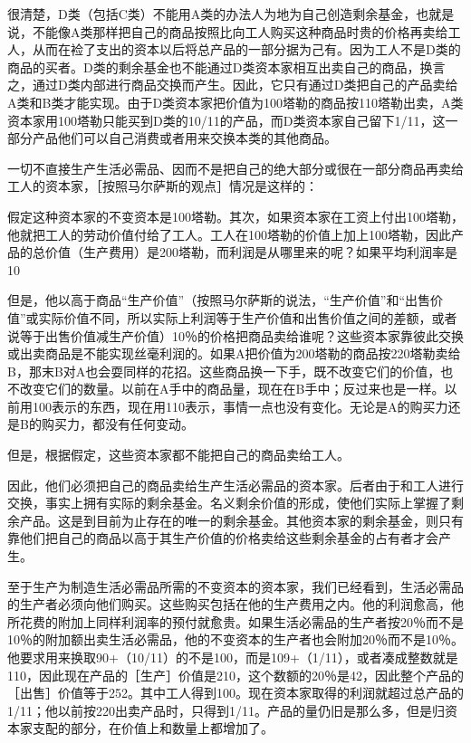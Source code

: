 很清楚，D类（包括C类）不能用A类的办法人为地为自己创造剩余基金，也就是说，不能像A类那样把自己的商品按照比向工人购买这种商品时贵的价格再卖给工人，从而在裣了支出的资本以后将总产品的一部分据为己有。因为工人不是D类的商品的买者。D类的剩余基金也不能通过D类资本家相互出卖自己的商品，换言之，通过D类内部进行商品交换而产生。因此，它只有通过D类把自己的产品卖给A类和B类才能实现。由于D类资本家把价值为100塔勒的商品按110塔勒出卖，A类资本家用100塔勒只能买到D类的10/11的产品，而D类资本家自己留下1/11，这一部分产品他们可以自己消费或者用来交换本类的其他商品。

一切不直接生产生活必需品、因而不是把自己的绝大部分或很在一部分商品再卖给工人的资本家，［按照马尔萨斯的观点］情况是这样的：

假定这种资本家的不变资本是100塔勒。其次，如果资本家在工资上付出100塔勒，他就把工人的劳动价值付给了工人。工人在100塔勒的价值上加上100塔勒，因此产品的总价值（生产费用）是200塔勒，而利润是从哪里来的呢？如果平均利润率是10%

但是，他以高于商品“生产价值”（按照马尔萨斯的说法，“生产价值”和“出售价值”或实际价值不同，所以实际上利润等于生产价值和出售价值之间的差额，或者说等于出售价值减生产价值）10％的价格把商品卖给谁呢？这些资本家靠彼此交换或出卖商品是不能实现丝毫利润的。如果A把价值为200塔勒的商品按220塔勒卖给B，那末B对A也会耍同样的花招。这些商品换一下手，既不改变它们的价值，也不改变它们的数量。以前在A手中的商品量，现在在B手中；反过来也是一样。以前用100表示的东西，现在用110表示，事情一点也没有变化。无论是A的购买力还是B的购买力，都没有任何变动。

但是，根据假定，这些资本家都不能把自己的商品卖给工人。

因此，他们必须把自己的商品卖给生产生活必需品的资本家。后者由于和工人进行交换，事实上拥有实际的剩余基金。名义剩余价值的形成，使他们实际上掌握了剩余产品。这是到目前为止存在的唯一的剩余基金。其他资本家的剩余基金，则只有靠他们把自己的商品以高于其生产价值的价格卖给这些剩余基金的占有者才会产生。

至于生产为制造生活必需品所需的不变资本的资本家，我们已经看到，生活必需品的生产者必须向他们购买。这些购买包括在他的生产费用之内。他的利润愈高，他所花费的附加上同样利润率的预付就愈贵。如果生活必需品的生产者按20％而不是10％的附加额出卖生活必需品，他的不变资本的生产者也会附加20％而不是10％。他要求用来换取90+（10/11）的不是100，而是109+（1/11），或者凑成整数就是110，因此现在产品的［生产］价值是210，这个数额的20％是42，因此整个产品的［出售］价值等于252。其中工人得到100。现在资本家取得的利润就超过总产品的1/11；他以前按220出卖产品时，只得到1/11。产品的量仍旧是那么多，但是归资本家支配的部分，在价值上和数量上都增加了。

